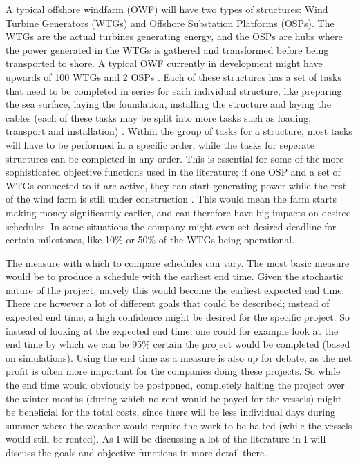 \documentclass[a4paper,12pt]{article}
\begin{document}
A typical offshore windfarm (OWF) will have two types of structures: Wind Turbine Generators (WTGs) and Offshore Substation Platforms (OSPs). The WTGs are the actual turbines generating energy, and the OSPs are hubs where the power generated in the WTGs is gathered and transformed before being transported to shore. A typical OWF currently in development might have upwards of 100 WTGs and 2 OSPs \cite{ruk2017, barlow2018mixed}. Each of these structures has a set of tasks that need to be completed in series for each individual structure, like preparing the sea surface, laying the foundation, installing the structure and laying the cables (each of these tasks may be split into more tasks such as loading, transport and installation) \cite{kerkhove2017optimised}. Within the group of tasks for a structure, most tasks will have to be performed in a specific order, while the tasks for seperate structures can be completed in any order. This is essential for some of the more sophisticated objective functions used in the literature; if one OSP and a set of WTGs connected to it are active, they can start generating power while the rest of the wind farm is still under construction \cite{barlow2017using}. This would mean the farm starts making money significantly earlier, and can therefore have big impacts on desired schedules. In some situations the company might even set desired deadline for certain milestones, like 10\% or 50\% of the WTGs being operational. 


The measure with which to compare schedules can vary. The most basic measure would be to produce a schedule with the earliest end time. Given the stochastic nature of the project, naively this would become the earliest expected end time. There are however a lot of different goals that could be described; instead of expected end time, a high confidence might be desired for the specific project. So instead of looking at the expected end time, one could for example look at the end time by which we can be 95\% certain the project would be completed (based on simulations). Using the end time as a measure is also up for debate, as the net profit is often more important for the companies doing these projects. So while the end time would obviously be postponed, completely halting the project over the winter months (during which no rent would be payed for the vessels) might be beneficial for the total costs, since there will be less individual days during summer where the weather would require the work to be halted (while the vessels would still be rented). As I will be discussing a lot of the literature in  I will discuss the goals and objective functions in more detail there. 
\end{document}
